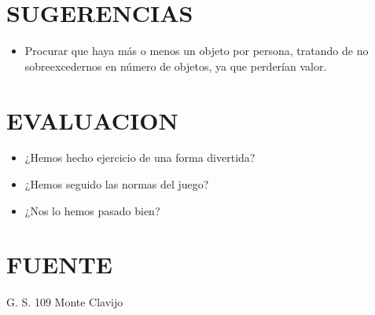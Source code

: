 \documentclass[72pt]{article}
\begin{document}
\section*{SUGERENCIAS}
\begin{itemize}
    \item Procurar que haya más o menos un objeto por persona, tratando de no sobreexcedernos en número de
        objetos, ya que perderían valor.
\end{itemize}

\section*{EVALUACION}
\begin{itemize}
    \item ¿Hemos hecho ejercicio de una forma divertida?
    \item ¿Hemos seguido las normas del juego?
    \item ¿Nos lo hemos pasado bien?
\end{itemize}

\section*{FUENTE}
G. S. 109 Monte Clavijo
\end{document}
